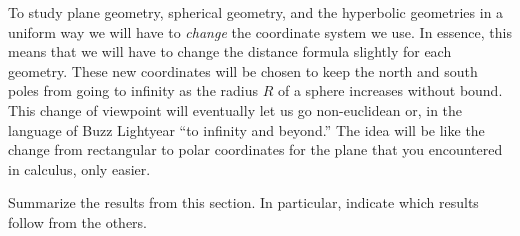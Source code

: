\documentclass{ximera}
\begin{document}
To study plane geometry, spherical geometry, and the hyperbolic
geometries in a uniform way we will have to \textit{change} the
coordinate system we use. In essence, this means that we will have to
change the distance formula slightly for each geometry. These new
coordinates will be chosen to keep the north and south poles from
going to infinity as the radius $R$ of a sphere increases without
bound. This change of viewpoint will eventually let us go
non-euclidean or, in the language of Buzz Lightyear ``to infinity and
beyond.'' The idea will be like the change from rectangular to polar
coordinates for the plane that you encountered in calculus, only
easier.


\begin{problem}
Summarize the results from this section. In particular, indicate which
results follow from the others.
\begin{freeResponse}
\end{freeResponse}
\end{problem}
\end{document}
